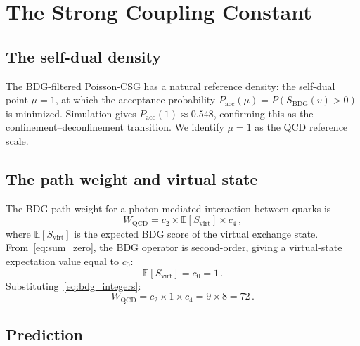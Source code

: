 \documentclass[11pt,twocolumn]{article}
\newcommand{\bdg}{\mathrm{BDG}}
\begin{document}
\section{The Strong Coupling Constant}

\subsection{The self-dual density}

The BDG-filtered Poisson-CSG has a natural reference density:
the self-dual point $\mu=1$, at which the acceptance probability
$P_{\mathrm{acc}}(\mu) = P(S_\bdg(v) > 0)$ is minimized.
Simulation gives
$P_{\mathrm{acc}}(1) \approx 0.548$, confirming this as the
confinement--deconfinement transition.
We identify $\mu=1$ as the QCD reference scale.

\subsection{The path weight and virtual state}

The BDG path weight for a photon-mediated interaction between quarks is
\begin{equation}
  W_{\mathrm{QCD}} = c_2\times \mathbb{E}[S_{\mathrm{virt}}]\times c_4\,,
  \label{eq:WQCD}
\end{equation}
where $\mathbb{E}[S_{\mathrm{virt}}]$ is the expected BDG score of
the virtual exchange state.
From~\eqref{eq:sum_zero}, the BDG operator is second-order, giving
a virtual-state expectation value equal to $c_0$:
\begin{equation}
  \mathbb{E}[S_{\mathrm{virt}}] = c_0 = 1\,.
  \label{eq:Svirt}
\end{equation}
Substituting~\eqref{eq:bdg_integers}:
\begin{equation}
  W_{\mathrm{QCD}} = c_2 \times 1 \times c_4 = 9 \times 8 = 72\,.
  \label{eq:W72}
\end{equation}

\subsection{Prediction}
\end{document}
